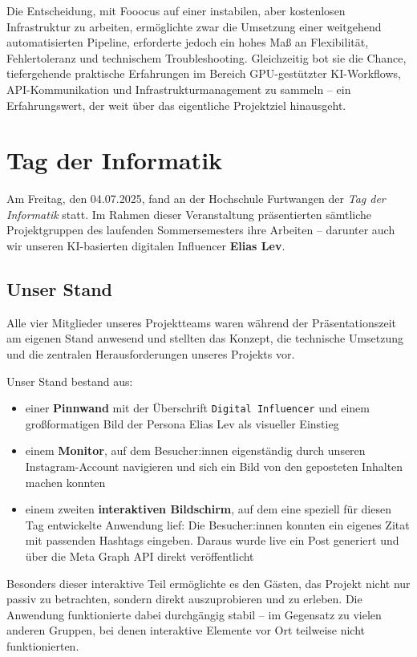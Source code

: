 \documentclass[a4paper,12pt]{article}
\begin{document}
Die Entscheidung, mit Fooocus auf einer instabilen, aber kostenlosen Infrastruktur zu arbeiten, ermöglichte zwar die Umsetzung einer weitgehend automatisierten Pipeline, erforderte jedoch ein hohes Maß an Flexibilität, Fehlertoleranz und technischem Troubleshooting. Gleichzeitig bot sie die Chance, tiefergehende praktische Erfahrungen im Bereich GPU-gestützter KI-Workflows, API-Kommunikation und Infrastrukturmanagement zu sammeln – ein Erfahrungswert, der weit über das eigentliche Projektziel hinausgeht.



\section{Tag der Informatik}

Am Freitag, den 04.07.2025, fand an der Hochschule Furtwangen der \textit{Tag der Informatik} statt. Im Rahmen dieser Veranstaltung präsentierten sämtliche Projektgruppen des laufenden Sommersemesters ihre Arbeiten – darunter auch wir unseren KI-basierten digitalen Influencer \textbf{Elias Lev}.

\subsection{Unser Stand}

Alle vier Mitglieder unseres Projektteams waren während der Präsentationszeit am eigenen Stand anwesend und stellten das Konzept, die technische Umsetzung und die zentralen Herausforderungen unseres Projekts vor.

Unser Stand bestand aus:

\begin{itemize}
    \item einer \textbf{Pinnwand} mit der Überschrift \texttt{Digital Influencer} und einem großformatigen Bild der Persona Elias Lev als visueller Einstieg
    \item einem \textbf{Monitor}, auf dem Besucher:innen eigenständig durch unseren Instagram-Account navigieren und sich ein Bild von den geposteten Inhalten machen konnten
    \item einem zweiten \textbf{interaktiven Bildschirm}, auf dem eine speziell für diesen Tag entwickelte Anwendung lief: Die Besucher:innen konnten ein eigenes Zitat mit passenden Hashtags eingeben. Daraus wurde live ein Post generiert und über die Meta Graph API direkt veröffentlicht
\end{itemize}

Besonders dieser interaktive Teil ermöglichte es den Gästen, das Projekt nicht nur passiv zu betrachten, sondern direkt auszuprobieren und zu erleben. Die Anwendung funktionierte dabei durchgängig stabil – im Gegensatz zu vielen anderen Gruppen, bei denen interaktive Elemente vor Ort teilweise nicht funktionierten.
\end{document}
